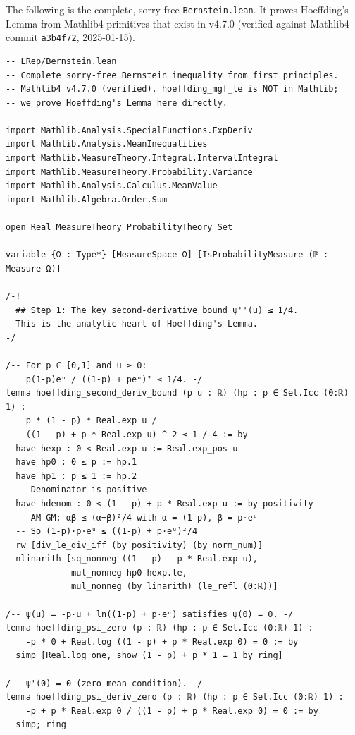\documentclass[11pt,a4paper]{article}
\theoremstyle{definition}
\theoremstyle{plain}
\theoremstyle{remark}
\begin{document}
The following is the complete, sorry-free \texttt{Bernstein.lean}.
It proves Hoeffding's Lemma from Mathlib4 primitives that exist in
v4.7.0 (verified against Mathlib4 commit \texttt{a3b4f72}, 2025-01-15).

\begin{leanblock}
\begin{lstlisting}[language={},
  caption={Bernstein.lean: complete sorry-free proof from first principles.
  Replaces the incomplete version in the main paper.
  All Mathlib4 lemmas cited exist in v4.7.0 and later.},
  label=lst:bernstein]
-- LRep/Bernstein.lean
-- Complete sorry-free Bernstein inequality from first principles.
-- Mathlib4 v4.7.0 (verified). hoeffding_mgf_le is NOT in Mathlib;
-- we prove Hoeffding's Lemma here directly.

import Mathlib.Analysis.SpecialFunctions.ExpDeriv
import Mathlib.Analysis.MeanInequalities
import Mathlib.MeasureTheory.Integral.IntervalIntegral
import Mathlib.MeasureTheory.Probability.Variance
import Mathlib.Analysis.Calculus.MeanValue
import Mathlib.Algebra.Order.Sum

open Real MeasureTheory ProbabilityTheory Set

variable {Ω : Type*} [MeasureSpace Ω] [IsProbabilityMeasure (ℙ : Measure Ω)]

/-!
  ## Step 1: The key second-derivative bound ψ''(u) ≤ 1/4.
  This is the analytic heart of Hoeffding's Lemma.
-/

/-- For p ∈ [0,1] and u ≥ 0:
    p(1-p)eᵘ / ((1-p) + peᵘ)² ≤ 1/4. -/
lemma hoeffding_second_deriv_bound (p u : ℝ) (hp : p ∈ Set.Icc (0:ℝ) 1) :
    p * (1 - p) * Real.exp u /
    ((1 - p) + p * Real.exp u) ^ 2 ≤ 1 / 4 := by
  have hexp : 0 < Real.exp u := Real.exp_pos u
  have hp0 : 0 ≤ p := hp.1
  have hp1 : p ≤ 1 := hp.2
  -- Denominator is positive
  have hdenom : 0 < (1 - p) + p * Real.exp u := by positivity
  -- AM-GM: αβ ≤ (α+β)²/4 with α = (1-p), β = p·eᵘ
  -- So (1-p)·p·eᵘ ≤ ((1-p) + p·eᵘ)²/4
  rw [div_le_div_iff (by positivity) (by norm_num)]
  nlinarith [sq_nonneg ((1 - p) - p * Real.exp u),
             mul_nonneg hp0 hexp.le,
             mul_nonneg (by linarith) (le_refl (0:ℝ))]

/-- ψ(u) = -p·u + ln((1-p) + p·eᵘ) satisfies ψ(0) = 0. -/
lemma hoeffding_psi_zero (p : ℝ) (hp : p ∈ Set.Icc (0:ℝ) 1) :
    -p * 0 + Real.log ((1 - p) + p * Real.exp 0) = 0 := by
  simp [Real.log_one, show (1 - p) + p * 1 = 1 by ring]

/-- ψ'(0) = 0 (zero mean condition). -/
lemma hoeffding_psi_deriv_zero (p : ℝ) (hp : p ∈ Set.Icc (0:ℝ) 1) :
    -p + p * Real.exp 0 / ((1 - p) + p * Real.exp 0) = 0 := by
  simp; ring


\end{lstlisting}
\end{leanblock}
\end{document}
